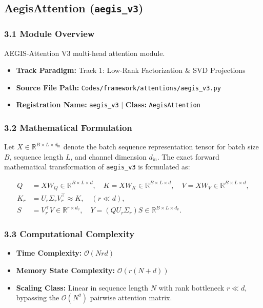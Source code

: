 \subsection{AegisAttention (\texttt{aegis\_v3})}
\label{sec:app_module_aegis\_v3}

\subsubsection*{3.1 Module Overview}
AEGIS-Attention V3 multi-head attention module.
\begin{itemize}
    \item \textbf{Track Paradigm:} Track 1: Low-Rank Factorization & SVD Projections
    \item \textbf{Source File Path:} \texttt{Codes/framework/attentions/aegis\_v3.py}
    \item \textbf{Registration Name:} \texttt{aegis\_v3} $\mid$ \textbf{Class:} \texttt{AegisAttention}
\end{itemize}

\subsubsection*{3.2 Mathematical Formulation}
Let $X \in \mathbb{R}^{B \times L \times d_{\text{in}}}$ denote the batch sequence representation tensor for batch size $B$, sequence length $L$, and channel dimension $d_{\text{in}}$. The exact forward mathematical transformation of \texttt{aegis\_v3} is formulated as:

\begin{align}
Q &= X W_Q \in \mathbb{R}^{B \times L \times d}, \quad K = X W_K \in \mathbb{R}^{B \times L \times d}, \quad V = X W_V \in \mathbb{R}^{B \times L \times d}, \\
K_r &= U_r \Sigma_r V_r^\top \approx K, \quad (r \ll d), \\
S &= V_r^\top V \in \mathbb{R}^{r \times d_v}, \quad Y = (Q U_r \Sigma_r) S \in \mathbb{R}^{B \times L \times d_v}.
\end{align}


\subsubsection*{3.3 Computational Complexity}
\begin{itemize}
    \item \textbf{Time Complexity:} $\mathcal{O}(N r d)$
    \item \textbf{Memory State Complexity:} $\mathcal{O}(r(N + d))$
    \item \textbf{Scaling Class:} Linear in sequence length $N$ with rank bottleneck $r \ll d$, bypassing the $\mathcal{O}(N^2)$ pairwise attention matrix.
\end{itemize}

